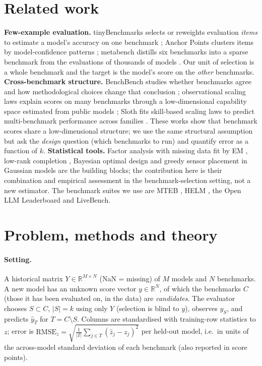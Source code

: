 \documentclass{article}
\newcommand{\rmse}{\mathrm{RMSE}_z}
\begin{document}
\section{Related work}
\textbf{Few-example evaluation.} tinyBenchmarks selects or reweights evaluation \emph{items} to estimate a model's accuracy on one benchmark \citep{polo2024tiny}; Anchor Points clusters items by model-confidence patterns \citep{vivek2024anchor}; metabench distills six benchmarks into a sparse benchmark from the evaluations of thousands of models \citep{kipnis2024metabench}. Our unit of selection is a whole benchmark and the target is the model's score on the \emph{other} benchmarks.
\textbf{Cross-benchmark structure.} BenchBench studies whether benchmarks agree and how methodological choices change that conclusion \citep{perlitz2024benchbench}; observational scaling laws explain scores on many benchmarks through a low-dimensional capability space estimated from public models \citep{ruan2024observational}; Sloth fits skill-based scaling laws to predict multi-benchmark performance across families \citep{polo2024sloth}. These works show that benchmark scores share a low-dimensional structure; we use the same structural assumption but ask the \emph{design} question (which benchmarks to run) and quantify error as a function of $k$.
\textbf{Statistical tools.} Factor analysis with missing data fit by EM \citep{rubin1982em,tipping1999ppca}, low-rank completion \citep{candes2012exact}, Bayesian optimal design \citep{chaloner1995bayesian} and greedy sensor placement in Gaussian models \citep{guestrin2005near} are the building blocks; the contribution here is their combination and empirical assessment in the benchmark-selection setting, not a new estimator. The benchmark suites we use are MTEB \citep{muennighoff2022mteb}, HELM \citep{liang2022helm}, the Open LLM Leaderboard and LiveBench.

\section{Problem, methods and theory}
\paragraph{Setting.} A historical matrix $Y\in\mathbb{R}^{M\times N}$ (NaN = missing) of $M$ models and $N$ benchmarks. A new model has an unknown score vector $y\in\mathbb{R}^N$, of which the benchmarks $C$ (those it has been evaluated on, in the data) are \emph{candidates}. The evaluator chooses $S\subset C$, $|S|=k$ using only $Y$ (selection is blind to $y$), observes $y_S$, and predicts $\hat y_T$ for $T=C\setminus S$. Columns are standardised with training-row statistics to $z$; error is $\rmse=\sqrt{\frac1{|T|}\sum_{j\in T}(\hat z_j-z_j)^2}$ per held-out model, i.e.\ in units of the across-model standard deviation of each benchmark (also reported in score points).
\end{document}
